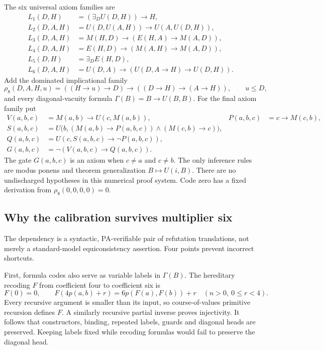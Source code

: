 \documentclass[11pt,letterpaper]{article}
\begin{document}
The six universal axiom families are
\begin{align*}
 L_1(D,H)&=(\exists_D U(D,H))\to H,\\
 L_2(D,A,H)&=U(D,U(A,H))\to U(A,U(D,H)),\\
 L_3(D,A,H)&=M(H,D)\to(E(H,A)\to M(A,D)),\\
 L_4(D,A,H)&=E(H,D)\to(M(A,H)\to M(A,D)),\\
 L_5(D,H)&=\exists_D E(H,D),\\
 L_6(D,A,H)&=U(D,A)\to(U(D,A\to H)\to U(D,H)).
\end{align*}
Add the dominated implicational family
\[
 \rho_8(D,A,H,u)=((H\to u)\to D)\to((D\to H)\to(A\to H)),
 \qquad u\le D,
\]
and every diagonal-vacuity formula
\(\Gamma(B)=B\to U(B,B)\).
For the final axiom family put
\begin{align*}
 V(a,b,c)&=M(a,b)\to U(c,M(a,b)),&P(a,b,c)&=c\to M(c,b),\\
 S(a,b,c)&=U\bigl(b,(M(a,b)\to P(a,b,c))\wedge(M(c,b)\to c)\bigr),\\
 Q(a,b,c)&=U(c,S(a,b,c)\to\neg P(a,b,c)),\\
 G(a,b,c)&=\neg(V(a,b,c)\to Q(a,b,c)).
\end{align*}
The gate \(G(a,b,c)\) is an axiom when \(c\ne a\) and \(c\ne b\).
The only inference rules are modus ponens and theorem generalization
\(B\mapsto U(i,B)\). There are no undischarged hypotheses in this numerical
proof system. Code zero has a fixed derivation from
\(\rho_8(0,0,0,0)=0\).

\subsection{Why the calibration survives multiplier six}

The dependency is a syntactic, PA-verifiable pair of refutation translations,
not merely a standard-model equiconsistency assertion. Four points prevent
incorrect shortcuts.

First, formula codes also serve as variable labels in \(\Gamma(B)\).
The hereditary recoding \(F\) from coefficient four to coefficient six is
\[
 F(0)=0,\qquad F(4p(a,b)+r)=6p(F(a),F(b))+r\quad(n>0,\ 0\le r<4).
\]
Every recursive argument is smaller than its input, so course-of-values
primitive recursion defines \(F\). A similarly recursive partial inverse
proves injectivity. It follows that constructors, binding, repeated labels,
guards and diagonal heads are preserved. Keeping labels fixed while
recoding formulas would fail to preserve the diagonal head.
\end{document}

